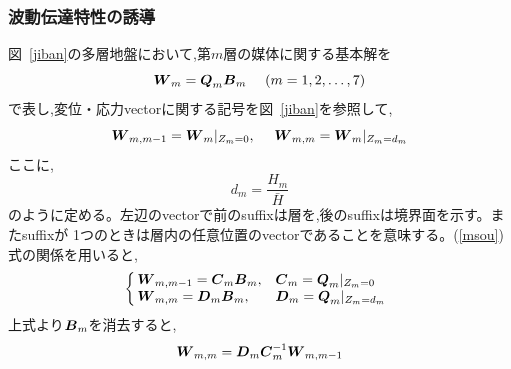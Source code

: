 \documentclass[titlepage]{jsarticle}
\def\dfrac#1#2{{\displaystyle\frac{#1}{#2}}}
\begin{document}
\subsubsection{波動伝達特性の誘導}
図~\ref{jiban}の多層地盤において,第$m$層の媒体に関する基本解を
\begin{equation}
\mbox{\boldmath $W$} _m = \mbox{\boldmath $Q$} _m \mbox{\boldmath $B$} _m 
~~~~(m = 1,2, \ldots ,7) \label{msou} 
\end{equation}
で表し,変位・応力vectorに関する記号を図~\ref{jiban}を参照して,
\begin{equation}
\mbox{\boldmath $W$} _{m,m-1} = \mbox{\boldmath $W$} _m | _{Z_m = 0} , ~~~~
\mbox{\boldmath $W$} _{m,m} = \mbox{\boldmath $W$} _m | _{Z_m = d_m} \label{kigou}
\end{equation}
ここに,
\begin{equation}
d_m = \dfrac{H_m}{\bar{H}} \label{soatsu} 
\end{equation}
のように定める。左辺のvectorで前のsuffixは層を,後のsuffixは境界面を示す。またsuffixが
1つのときは層内の任意位置のvectorであることを意味する。(\ref{msou})式の関係を用いると,
\begin{equation}
\left\{ \begin{array}{@{\,}ll}
\mbox{\boldmath $W$} _{m,m-1} = \mbox{\boldmath $C$} _m \mbox{\boldmath $B$} _m , & 
\mbox{\boldmath $C$} _m = \mbox{\boldmath $Q$} _m | _{Z_m = 0} \\
\mbox{\boldmath $W$} _{m,m} = \mbox{\boldmath $D$} _m \mbox{\boldmath $B$} _m , &
\mbox{\boldmath $D$} _m = \mbox{\boldmath $Q$} _m | _{Z_m = d_m} 
\end{array} \right. \label{kigou1} 
\end{equation}
上式より$\mbox{\boldmath $B$} _m$を消去すると,
\begin{equation}
\mbox{\boldmath $W$} _{m,m} = \mbox{\boldmath $D$} _m \mbox{\boldmath $C$} ^{-1}_m 
				\mbox{\boldmath $W$} _{m,m-1} \label{zen} 
\end{equation}
\end{document}
